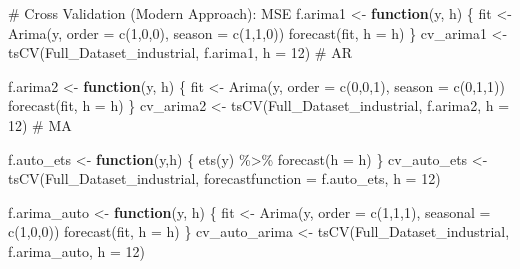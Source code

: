 \documentclass[
  letterpaper,
  DIV=11,
  numbers=noendperiod]{scrartcl}
\newenvironment{Shaded}{\begin{snugshade}}{\end{snugshade}}
\newcommand{\AttributeTok}[1]{\textcolor[rgb]{0.40,0.45,0.13}{#1}}
\newcommand{\CommentTok}[1]{\textcolor[rgb]{0.37,0.37,0.37}{#1}}
\newcommand{\ControlFlowTok}[1]{\textcolor[rgb]{0.00,0.23,0.31}{\textbf{#1}}}
\newcommand{\DecValTok}[1]{\textcolor[rgb]{0.68,0.00,0.00}{#1}}
\newcommand{\FunctionTok}[1]{\textcolor[rgb]{0.28,0.35,0.67}{#1}}
\newcommand{\NormalTok}[1]{\textcolor[rgb]{0.00,0.23,0.31}{#1}}
\newcommand{\OtherTok}[1]{\textcolor[rgb]{0.00,0.23,0.31}{#1}}
\newcommand{\SpecialCharTok}[1]{\textcolor[rgb]{0.37,0.37,0.37}{#1}}
\begin{document}
\begin{Shaded}
\begin{Highlighting}[]
\CommentTok{\# Cross Validation (Modern Approach): MSE}
\NormalTok{f.arima1 }\OtherTok{\textless{}{-}} \ControlFlowTok{function}\NormalTok{(y, h) \{}
\NormalTok{  fit }\OtherTok{\textless{}{-}} \FunctionTok{Arima}\NormalTok{(y, }\AttributeTok{order =} \FunctionTok{c}\NormalTok{(}\DecValTok{1}\NormalTok{,}\DecValTok{0}\NormalTok{,}\DecValTok{0}\NormalTok{), }\AttributeTok{season =} \FunctionTok{c}\NormalTok{(}\DecValTok{1}\NormalTok{,}\DecValTok{1}\NormalTok{,}\DecValTok{0}\NormalTok{))}
  \FunctionTok{forecast}\NormalTok{(fit, }\AttributeTok{h =}\NormalTok{ h)}
\NormalTok{\}}
\NormalTok{cv\_arima1 }\OtherTok{\textless{}{-}} \FunctionTok{tsCV}\NormalTok{(Full\_Dataset\_industrial, f.arima1, }\AttributeTok{h =} \DecValTok{12}\NormalTok{) }\CommentTok{\# AR}


\NormalTok{f.arima2 }\OtherTok{\textless{}{-}} \ControlFlowTok{function}\NormalTok{(y, h) \{}
\NormalTok{  fit }\OtherTok{\textless{}{-}} \FunctionTok{Arima}\NormalTok{(y, }\AttributeTok{order =} \FunctionTok{c}\NormalTok{(}\DecValTok{0}\NormalTok{,}\DecValTok{0}\NormalTok{,}\DecValTok{1}\NormalTok{), }\AttributeTok{season =} \FunctionTok{c}\NormalTok{(}\DecValTok{0}\NormalTok{,}\DecValTok{1}\NormalTok{,}\DecValTok{1}\NormalTok{))}
  \FunctionTok{forecast}\NormalTok{(fit, }\AttributeTok{h =}\NormalTok{ h)}
\NormalTok{\}}
\NormalTok{cv\_arima2 }\OtherTok{\textless{}{-}} \FunctionTok{tsCV}\NormalTok{(Full\_Dataset\_industrial, f.arima2, }\AttributeTok{h =} \DecValTok{12}\NormalTok{) }\CommentTok{\# MA}


\NormalTok{f.auto\_ets }\OtherTok{\textless{}{-}} \ControlFlowTok{function}\NormalTok{(y,h) \{}
  \FunctionTok{ets}\NormalTok{(y) }\SpecialCharTok{\%\textgreater{}\%} \FunctionTok{forecast}\NormalTok{(}\AttributeTok{h =}\NormalTok{ h)}
\NormalTok{\}}
\NormalTok{cv\_auto\_ets }\OtherTok{\textless{}{-}} \FunctionTok{tsCV}\NormalTok{(Full\_Dataset\_industrial, }\AttributeTok{forecastfunction =}\NormalTok{ f.auto\_ets, }\AttributeTok{h =} \DecValTok{12}\NormalTok{)}


\NormalTok{f.arima\_auto }\OtherTok{\textless{}{-}} \ControlFlowTok{function}\NormalTok{(y, h) \{}
\NormalTok{  fit }\OtherTok{\textless{}{-}} \FunctionTok{Arima}\NormalTok{(y, }\AttributeTok{order =} \FunctionTok{c}\NormalTok{(}\DecValTok{1}\NormalTok{,}\DecValTok{1}\NormalTok{,}\DecValTok{1}\NormalTok{), }\AttributeTok{seasonal =} \FunctionTok{c}\NormalTok{(}\DecValTok{1}\NormalTok{,}\DecValTok{0}\NormalTok{,}\DecValTok{0}\NormalTok{))}
  \FunctionTok{forecast}\NormalTok{(fit, }\AttributeTok{h =}\NormalTok{ h)}
\NormalTok{\}}
\NormalTok{cv\_auto\_arima }\OtherTok{\textless{}{-}} \FunctionTok{tsCV}\NormalTok{(Full\_Dataset\_industrial, f.arima\_auto, }\AttributeTok{h =} \DecValTok{12}\NormalTok{) }



\end{Highlighting}
\end{Shaded}
\end{document}
